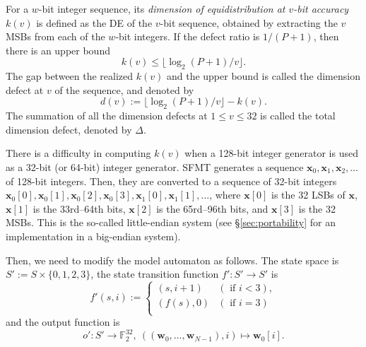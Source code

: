 \documentclass{svmult}
\def\F2{{\mathbb F}_2}
\def\bx{{{\mathbf x}}}
\def\bw{{{\mathbf w}}}
\begin{document}
For a $w$-bit integer sequence, its {\em dimension of 
equidistribution at $v$-bit accuracy} $k(v)$
is defined as the DE of the $v$-bit sequence, obtained by extracting
the $v$ MSBs from each of the $w$-bit integers.
If the defect ratio is $1/(P+1)$, 
then there is an upper bound 
$$
k(v) \leq \lfloor \log_2 (P+1) / v \rfloor.
$$
The gap between the realized $k(v)$ and the upper bound is
called the dimension defect at $v$ of the sequence,
and denoted by
$$
d(v):=\lfloor \log_2 (P+1) / v \rfloor -k(v).
$$
The summation of all the dimension defects at
$1 \leq v \leq 32$ is called the total dimension defect, 
denoted by $\Delta$.

There is a difficulty in computing $k(v)$ when 
a 128-bit integer generator is used as a 32-bit 
(or 64-bit) integer generator.
SFMT generates a sequence
$\bx_0, \bx_1, \bx_2, \ldots$ of 128-bit integers. 
Then, they are converted to a sequence of 32-bit integers
$\bx_0[0], \bx_0[1], \bx_0[2], \bx_0[3], \bx_1[0], \bx_1[1],\ldots$,
where 
$\bx[0]$ is the 32 LSBs of $\bx$, 
$\bx[1]$ is the 33rd--64th bits,
$\bx[2]$ is the 65rd--96th bits,
and $\bx[3]$ is the 32 MSBs. This is the so-called
little-endian system (see \S\ref{sec:portability} for
an implementation in a big-endian system). 

Then, we need to modify the model automaton
as follows.
The state space is $S':=S \times \{0,1,2,3\}$,
the state transition function $f':S' \to S'$ is
$$
f'(s,i):=
\left\{
\begin{array}{cl}
(s, i+1) & (\mbox{ if $i<3$}), \\
(f(s), 0) & (\mbox{ if $i=3$}) \\
\end{array}
\right.
$$
and the output function is 
$$o': S' \to \F2^{32},\  ((\bw_0,\ldots,\bw_{N-1}),i) \mapsto \bw_0[i].$$
\end{document}
